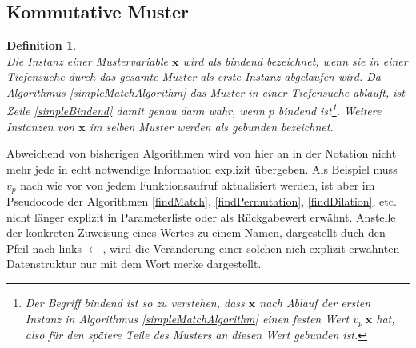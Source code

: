 \subsection{Kommutative Muster} \label{subsecACMuster}

\newtheorem{defBindend}[bsp]{Definition}
\begin{defBindend}~\\
Die Instanz einer Mustervariable $\mathbf x$ wird als \emph{bindend}  bezeichnet, wenn sie in einer Tiefensuche durch das gesamte Muster als erste Instanz abgelaufen wird. Da Algorithmus \ref{simpleMatchAlgorithm} das Muster in einer Tiefensuche abläuft, ist Zeile \ref{simpleBindend} damit genau dann wahr, wenn $p$ bindend ist\footnote{Der Begriff \emph{bindend} ist so zu verstehen, dass $\mathbf x$ nach Ablauf der ersten Instanz in Algorithmus \ref{simpleMatchAlgorithm} einen festen Wert $v_p~\mathbf x$ hat, also für den spätere Teile des Musters an diesen Wert gebunden ist.}. Weitere Instanzen von $\mathbf x$ im selben Muster werden als \emph{gebunden} bezeichnet.
\end{defBindend}

Abweichend von bisherigen Algorithmen wird von hier an in der Notation nicht mehr jede in echt notwendige Information explizit übergeben. Als Beispiel muss $v_p$ nach wie vor von jedem Funktionsaufruf aktualisiert werden, ist aber im Pseudocode der Algorithmen \ref{findMatch}, \ref{findPermutation}, \ref{findDilation}, etc. nicht länger explizit in Parameterliste oder als Rückgabewert erwähnt.
Anstelle der konkreten Zuweisung eines Wertes zu einem Namen, dargestellt duch den Pfeil nach links \glqq $\leftarrow$\grqq{}, wird die Veränderung einer solchen nich explizit erwähnten Datenstruktur nur mit dem Wort \glqq merke\grqq{} dargestellt.


